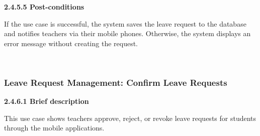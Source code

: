 \indent\textbf{2.4.5.5 Post-conditions}\\
\vspace{-0.7em}
\par\indent\indent\parbox{0.9\textwidth}{
    If the use case is successful, the system saves the leave request to the database and notifies teachers via their mobile phones. Otherwise, the system displays an error message without creating the request.
}\\

\subsubsection{Leave Request Management: Confirm Leave Requests}
\indent\indent\textbf{2.4.6.1 Brief description}
\vspace{0.5em}
\par\indent\indent\parbox{0.9\textwidth}{
    This use case shows teachers approve, reject, or revoke leave requests for students through the mobile applications.
}\\

